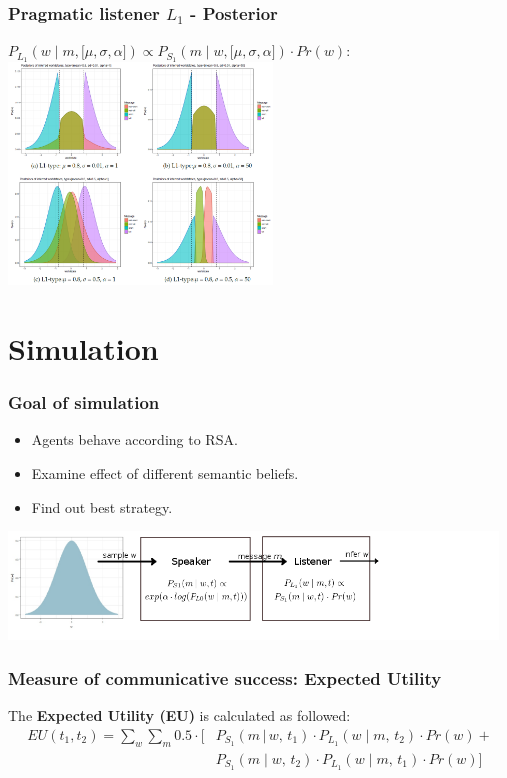 \documentclass[8pt]{beamer}
\newcommand{\stp}{\item[$\bullet$]}%
\begin{document}
\begin{frame}
\frametitle{Pragmatic listener $L_1$ - Posterior}
\vskip5mm
$P_{L_1}(w \mid m, \big[ \mu, \sigma, \alpha\big]) \propto P_{S_1}(m \mid w, \big[ \mu, \sigma, \alpha\big]) \cdot Pr(w)$:
\vskip5mm
\includegraphics[width=7cm]{bilder/L1-posterior.png}
\end{frame}

\section{Simulation}
\begin{frame}
\frametitle{Goal of simulation}
\vskip5mm
	\begin{itemize}
		\stp Agents behave according to RSA.\newline
		\stp Examine effect of different semantic beliefs.\newline
		\stp Find out best strategy.\newline
	\end{itemize}
\includegraphics[width=13cm]{bilder/procedure.png}\\
\end{frame}

\begin{frame}
\frametitle{Measure of communicative success: Expected Utility}
The \textbf{Expected Utility (EU)} is calculated as followed:
\vskip5mm
\begin{align*}
EU(t_1, t_2) = \sum \limits_{w} \sum \limits_{m} 0.5 \cdot \big[ &P_{S_1}(m\,|\,w ,\, t_1) \cdot P_{L_1}(w \mid m ,\, t_2) \cdot Pr(w) + \\
&P_{S_1}(m \mid w ,\, t_2) \cdot P_{L_1}(w \mid m ,\, t_1) \cdot Pr(w) \big] \nonumber
\end{align*}
\end{frame}
\end{document}
